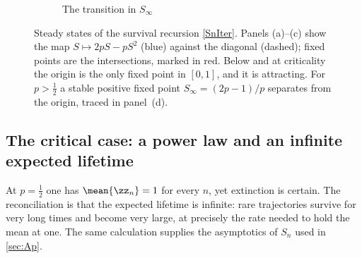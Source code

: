 \begin{figure}[htbp]
    \vspace{10pt}
    \begin{subfigure}[b]{0.55\textwidth}
    \centering
    \caption{The transition in $S_\infty$}
    \end{subfigure}

    \caption{Steady states of the survival recursion \cref{SnIter}. Panels (a)--(c) show the map \(S\mapsto 2pS-pS^{2}\) (blue) against the diagonal (dashed); fixed points are the intersections, marked in red. Below and at criticality the origin is the only fixed point in \([0,1]\), and it is attracting. For \(p>\tfrac12\) a stable positive fixed point \(S_\infty=(2p-1)/p\) separates from the origin, traced in panel~(d).}
    \label{fig:phase_transition}
\end{figure}

\subsection{The critical case: a power law and an infinite expected lifetime}
\label{sec:criticalcase}

At \(p=\tfrac12\) one has \(\mean{\zz_n}=1\) for every \(n\), yet extinction is certain. The reconciliation is that the expected lifetime is infinite: rare trajectories survive for very long times and become very large, at precisely the rate needed to hold the mean at one. The same calculation supplies the asymptotics of \(S_n\) used in \cref{sec:Ap}.

